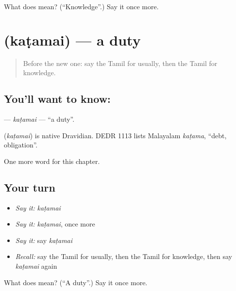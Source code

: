 \begin{tcolorbox}[breakable,colback=teal!4,colframe=teal!35!black,title={Before you move on}]
What does  mean? (\textquotedblleft{}Knowledge\textquotedblright{}.) Say it once more.
\end{tcolorbox}
\section[\texorpdfstring{\ta{கடமை} (kaṭamai)}{கடமை (kaṭamai)}]{ (kaṭamai) — a duty}

\label{lesson:TA-C208-katamai}



\begin{quote}
Before the new one: say the Tamil for usually, then the Tamil for knowledge.
\end{quote}

\subsection*{You'll want to know: }
\textbf{} — \emph{kaṭamai} — \textquotedblleft{}a duty\textquotedblright{}.

\begin{cousinweb}
\textbf{} (\emph{kaṭamai}) is native Dravidian. DEDR 1113 lists Malayalam \emph{kaṭama}, \textquotedblleft{}debt, obligation\textquotedblright{}.
\end{cousinweb}

\begin{grammarlens}[title={What you've built}]
One more word for this chapter.
\end{grammarlens}

\subsection*{Your turn}
\begin{itemize}
\raggedright
  \item \emph{Say it:} \emph{kaṭamai}
  \item \emph{Say it:} \emph{kaṭamai}, once more
  \item \emph{Say it:} say \emph{kaṭamai}
  \item \emph{Recall:} say the Tamil for usually, then the Tamil for knowledge, then say \emph{kaṭamai} again
\end{itemize}

\begin{tcolorbox}[breakable,colback=teal!4,colframe=teal!35!black,title={Before you move on}]
What does  mean? (\textquotedblleft{}A duty\textquotedblright{}.) Say it once more.
\end{tcolorbox}
